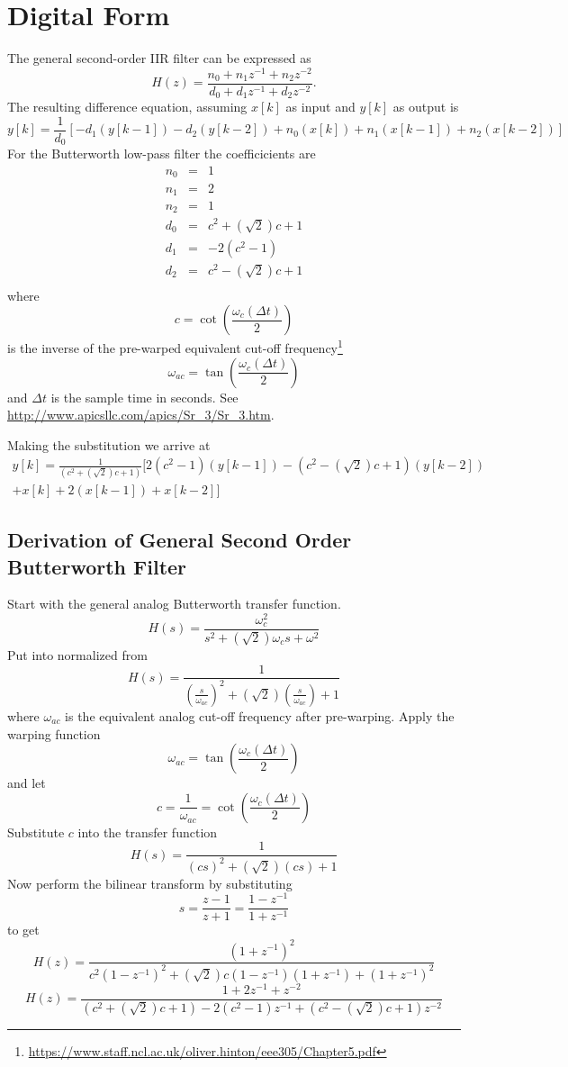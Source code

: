 \documentclass[12pt, letterpaper]{article}
\begin{document}
\section{Digital Form}
The general second-order IIR filter can be expressed as
\[ 
H(z) = \frac{n_0+n_1 z^{-1} + n_2 z^{-2}}{d_0 +d_1 z^{-1}+d_2 z^{-2}}.
\]
The resulting difference equation, assuming $x[k]$ as input and $y[k]$ as output is
\[
y[k] = \frac{1}{d_0}\left[ -d_1 (y[k-1]) -d_2(y[k-2]) + n_0(x[k]) + n_1(x[k-1]) + n_2 (x[k-2])\right]
\]
For the Butterworth low-pass filter the coefficicients are
\begin{eqnarray*}
n_0 & = & 1 \\
n_1 & = & 2 \\
n_2 & = & 1 \\
d_0 & = & c^2+(\sqrt{2})c+1 \\ 
d_1 & = & -2(c^2-1) \\ 
d_2 & = & c^2-(\sqrt{2})c+1 \\ 
\end{eqnarray*}
where
\[
c = \cot{\left(\frac{\omega_c (\Delta t)}{2}\right)}
\]
is the inverse of the pre-warped equivalent cut-off frequency\footnote{\url{https://www.staff.ncl.ac.uk/oliver.hinton/eee305/Chapter5.pdf}}
\[
\omega_{ac} = \tan{\left(\frac{\omega_c (\Delta t)}{2}\right)}
\]
and $\Delta t$ is the sample time in seconds.  See \url{http://www.apicsllc.com/apics/Sr_3/Sr_3.htm}.

Making the substitution we arrive at
\begin{multline*}
y[k] = \frac{1}{(c^2+(\sqrt{2})c+1)} \biggl[ 2(c^2-1)(y[k-1]) -(c^2-(\sqrt{2})c+1)(y[k-2])  \\
+ x[k] + 2(x[k-1]) + x[k-2]\biggr]
\end{multline*}

\subsection{Derivation of General Second Order Butterworth Filter}
Start with the general analog Butterworth transfer function.
\[
H(s) = \frac{\omega_c^2}{s^2 + (\sqrt{2})\omega_c s + \omega^2}
\]
Put into normalized from
\[
H(s) = \frac{1}{\left(\frac{s}{\omega_{ac}}\right)^2 + (\sqrt{2})\left(\frac{s}{\omega_{ac}}\right) + 1}
\]
where $\omega_{ac}$ is the equivalent analog cut-off frequency after pre-warping.
Apply the warping function
\[
\omega_{ac} = \tan{\left(\frac{\omega_c (\Delta t)}{2}\right)}
\]
and let
\[
c = \frac{1}{\omega_{ac}}=\cot{\left(\frac{\omega_c (\Delta t)}{2}\right)}
\]
Substitute $c$ into the transfer function
\[
H(s) = \frac{1}{(cs)^2 + (\sqrt{2})(cs) + 1}
\]
Now perform the bilinear transform by substituting
\[
s = \frac{z-1}{z+1}=\frac{1-z^{-1}}{1+z^{-1}}
\]
to get
\[
H(z) = \frac{ (1+z^{-1})^2 }{ c^2 (1-z^{-1})^2 + (\sqrt{2}) c (1-z^{-1})(1+z^{-1})+(1+z^{-1})^2}
\]
\[
H(z) = \frac{ 1 + 2 z^{-1} + z^{-2} }{ (c^2+(\sqrt{2})c+1) - 2(c^2-1)z^{-1} + (c^2 - (\sqrt{2})c +1) z^{-2}}
\]
\end{document}
